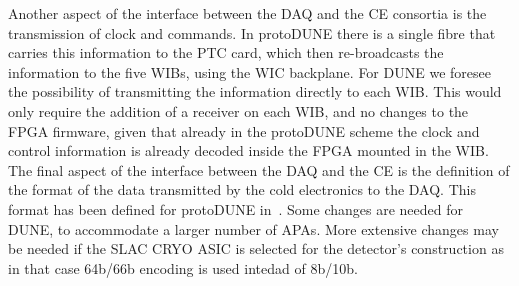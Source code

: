 Another aspect of the interface between the DAQ and the CE consortia is the
transmission of clock and commands. In protoDUNE there is a single fibre
that carries this information to the PTC card, which then re-broadcasts
the information to the five WIBs, using the WIC backplane. For DUNE we
foresee the possibility of transmitting the information directly to each
WIB. This would only require the addition of a receiver on each WIB, and
no changes to the FPGA firmware, given that already in the protoDUNE scheme
the clock and control information is already decoded inside the FPGA mounted
in the WIB. The final aspect of the interface between the DAQ and the CE is
the definition of the format of the data transmitted by the cold electronics
to the DAQ. This format has been defined for protoDUNE in~\cite{proto:data_format}.
Some changes are needed for DUNE, to accommodate a larger number of APAs.
More extensive changes may be needed if the SLAC CRYO ASIC is selected for
the detector's construction as in that case 64b/66b encoding is used intedad
of 8b/10b.
